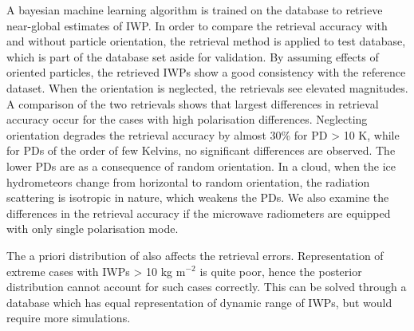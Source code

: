 \documentclass[amt, manuscript]{copernicus}
\begin{document}
A bayesian machine learning algorithm is trained on the database to retrieve near-global estimates of IWP. In order to compare the retrieval accuracy with and without particle orientation, the retrieval method is applied to test database, which is part of the database set aside for validation. By assuming effects of oriented particles, the retrieved IWPs  show a good consistency with the reference dataset. When the orientation is neglected, the retrievals see elevated magnitudes. A comparison of the two retrievals shows that largest differences in retrieval accuracy occur for the cases with high polarisation differences. Neglecting orientation degrades the retrieval accuracy by almost 30\% for PD > 10\,\,K, while for PDs of the order of few Kelvins, no significant differences are observed. The lower PDs are as a consequence of random orientation. In a cloud, when the ice hydrometeors change from horizontal to random orientation, the radiation scattering is isotropic in nature, which weakens the PDs. We also examine the differences in the retrieval accuracy if the microwave radiometers are equipped with only single polarisation mode. 






The a priori distribution of also affects the retrieval errors. Representation of extreme cases with IWPs > 10\,\,kg m$^{-2}$ is quite poor, hence the posterior distribution cannot account for such cases correctly. This can be solved through a database which has equal representation of dynamic range of IWPs, but would require more simulations. 



 













\end{document}
